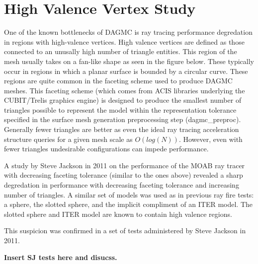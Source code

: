 \documentclass[10pt, a4paper]{article}
\begin{document}
\section{High Valence Vertex Study}%


One of the known bottlenecks of DAGMC is ray tracing performance degredation in regions with high-valence vertices. High valence vertices are defined as those connected to an unusally high number of triangle entities. This region of the mesh usually takes on a fan-like shape as seen in the figure below. These typically occur in regions in which a planar surface is bounded by a circular curve. These regions are quite common in the faceting scheme used to produce DAGMC meshes. This faceting scheme (which comes from ACIS libraries underlying the CUBIT/Trelis graphics engine) is designed to produce the smallest number of triangles possible to represent the model within the representation tolerance specified in the surface mesh generation preprocessing step (dagmc\_preproc). Generally fewer triangles are better as even the ideal ray tracing acceleration structure queries for a given mesh scale as $O(log(N))$. However, even with fewer triangles undesirable configurations can impede performance.

A study by Steve Jackson in 2011 on the performance of the MOAB ray tracer with decreasing faceting tolerance (similar to the ones above) revealed a sharp degredation in performance with decreasing faceting tolerance and increasing number of triangles. A similar set of models was used as in previous ray fire tests: a sphere, the slotted sphere, and the implicit compliment of an ITER model. The slotted sphere and ITER model are known to contain high valence regions.

This suspicion was confirmed in a set of tests administered by Steve Jackson in 2011.

\textbf{Insert SJ tests here and disucss.}
\end{document}
